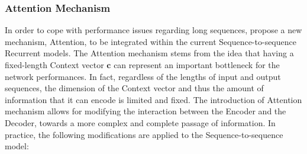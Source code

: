                         
            \subsubsection{Attention Mechanism}
            \label{subsub:attention_mechanism}
                In order to cope with performance issues regarding long sequences,  propose a new mechanism, Attention, to be integrated within the current Sequence-to-sequence Recurrent models. \newline
                The Attention mechanism stems from the idea that having a fixed-length Context vector $\mathbf{c}$ can represent an important bottleneck for the network performances. In fact, regardless of the lengths of input and output sequences, the dimension of the Context vector and thus the amount of information that it can encode is limited and fixed. The introduction of Attention mechanism allows for modifying the interaction between the Encoder and the Decoder, towards a more complex and complete passage of information. In practice, the following modifications are applied to the Sequence-to-sequence model:
                
